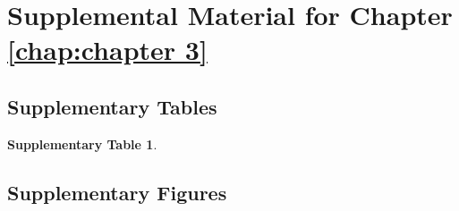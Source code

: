 \chapter{Supplemental Material for Chapter \ref{chap:chapter 3}}

\section{Supplementary Tables}

\noindent
\textbf{Supplementary Table 1}.

\section{Supplementary Figures}

